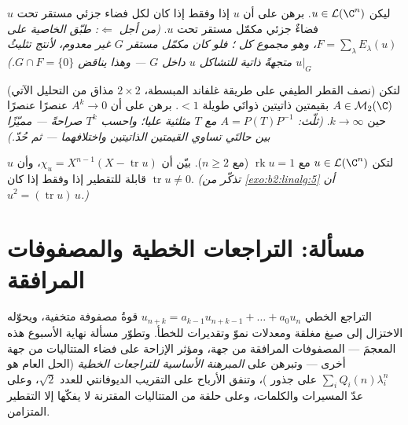 \begin{exercise}[$\star\star\star$]\label{exo:b2:reduction:10}
ليكن $u \in \mathcal{L}(\C^n)$. برهن على أن $u$  إذا
وفقط إذا كان لكل فضاء جزئي مستقر تحت $u$ فضاءٌ جزئي مكمّل
مستقر تحت $u$. \emph{(من أجل $\Leftarrow$: طبّق الخاصية
على $F = \sum_\lambda E_\lambda(u)$، وهو مجموع كل ؛ فلو كان
مكمّل مستقر $G$ غير معدوم، لأنتج تثليثُ $u|_G$
متجهةً ذاتية للتشاكل $u$ داخل $G$ --- وهذا يناقض $G \cap
F = \{0\}$.)}
\end{exercise}

\begin{exercise}[$\star\star\star$]\label{exo:b2:reduction:11}
(نصف القطر الطيفي على طريقة غلفاند المبسطة، $2\times2$ مذاق من التحليل
الآتي) لتكن $A \in \mathcal{M}_2(\C)$ بقيمتين ذاتيتين ذواتَي
طويلة $< 1$. برهن على أن $A^k \to 0$ عنصرًا عنصرًا حين $k \to \infty$.
\emph{(ثلّث: $A = P(T)P^{-1}$ مع $T$ مثلثية عليا؛
واحسب $T^k$ صراحةً --- مميّزًا بين حالتَي تساوي القيمتين
الذاتيتين واختلافهما --- ثم حُدّ.)}
\end{exercise}

\begin{exercise}[$\star\star$]\label{exo:b2:reduction:12}
لتكن $u \in \mathcal{L}(\C^n)$ مع $\operatorname{rk} u = 1$ (مع $n
\geq 2$). بيّن أن $\chi_u = X^{n-1}(X - \operatorname{tr} u)$،
وأن $u$ قابلة للتقطير إذا وفقط إذا كان $\operatorname{tr} u
\neq 0$. \emph{(تذكّر من \cref{exo:b2:linalg:5} أن $u^2 =
(\operatorname{tr} u)\,u$.)}
\end{exercise}

\section{مسألة: التراجعات الخطية والمصفوفات المرافقة}

التراجع الخطي $u_{n+k} = a_{k-1}u_{n+k-1} + \dots + a_0 u_n$
قوةُ مصفوفة متخفية، ويحوّله الاختزال إلى صيغ مغلقة
ومعدلات نموّ وتقديرات للخطأ. وتطوّر مسألة نهاية الأسبوع
هذه المعجمَ --- المصفوفات المرافقة من جهة، ومؤثر الإزاحة
على فضاء المتتاليات من جهة أخرى ---
وتبرهن على \emph{المبرهنة الأساسية للتراجعات الخطية}
(الحل العام هو $\sum_i Q_i(n)\lambda_i^n$ على جذور
)، وتنفق الأرباح على
التقريب الديوفانتي للعدد $\sqrt2$، وعلى عدّ المسيرات
والكلمات، وعلى حلقة من المتتاليات المقترنة لا يفكّها
إلا التقطير المتزامن.

